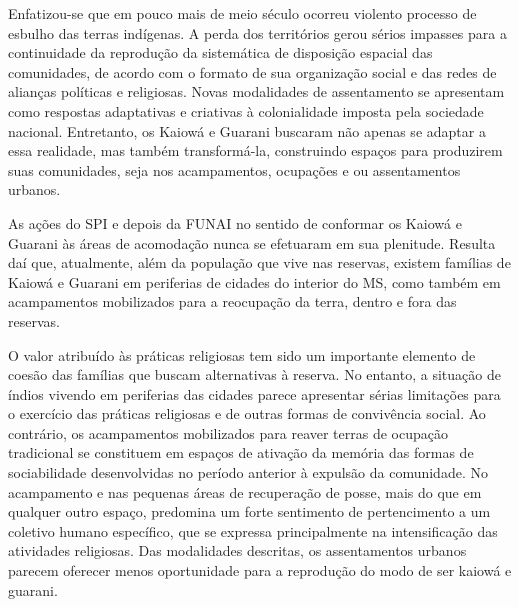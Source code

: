 Enfatizou-se que em pouco mais de meio século ocorreu violento processo
de esbulho das terras indígenas. A perda dos territórios gerou sérios
impasses para a continuidade da reprodução da sistemática de disposição
espacial das comunidades, de acordo com o formato de sua organização
social e das redes de alianças políticas e religiosas. Novas modalidades
de assentamento se apresentam como respostas adaptativas e criativas à
colonialidade imposta pela sociedade nacional. Entretanto, os Kaiowá e
Guarani buscaram não apenas se adaptar a essa realidade, mas também
transformá-la, construindo espaços para produzirem suas comunidades,
seja nos acampamentos, ocupações e ou assentamentos urbanos.

As ações do SPI e depois da FUNAI no sentido de conformar os Kaiowá e
Guarani às áreas de acomodação nunca se efetuaram em sua plenitude.
Resulta daí que, atualmente, além da população que vive nas reservas,
existem famílias de Kaiowá e Guarani em periferias de cidades do
interior do MS, como também em acampamentos mobilizados para a
reocupação da terra, dentro e fora das reservas.

O valor atribuído às práticas religiosas tem sido um importante elemento
de coesão das famílias que buscam alternativas à reserva. No entanto, a
situação de índios vivendo em periferias das cidades parece apresentar
sérias limitações para o exercício das práticas religiosas e de outras
formas de convivência social. Ao contrário, os acampamentos mobilizados
para reaver terras de ocupação tradicional se constituem em espaços de
ativação da memória das formas de sociabilidade desenvolvidas no período
anterior à expulsão da comunidade. No acampamento e nas pequenas áreas
de recuperação de posse, mais do que em qualquer outro espaço, predomina
um forte sentimento de pertencimento a um coletivo humano específico,
que se expressa principalmente na intensificação das atividades
religiosas. Das modalidades descritas, os assentamentos urbanos parecem
oferecer menos oportunidade para a reprodução do modo de ser kaiowá e
guarani.

